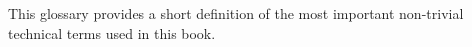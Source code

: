 
This glossary provides a short definition of the most important non-trivial technical terms used in this book.
